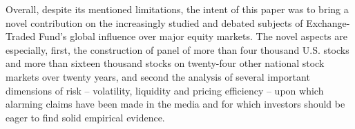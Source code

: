 Overall, despite its mentioned limitations, the intent of this paper was to bring a novel contribution on the increasingly studied and debated subjects of Exchange-Traded Fund's global influence over major equity markets. The novel aspects are especially, first, the construction of panel of more than four thousand U.S. stocks and more than sixteen thousand stocks on twenty-four other national stock markets over twenty years, and second the analysis of several important dimensions of risk -- volatility, liquidity and pricing efficiency -- upon which alarming claims have been made in the media and for which investors should be eager to find solid empirical evidence.

